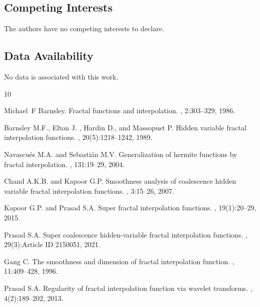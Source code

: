 \documentclass[sn-mathphys-num]{sn-jnl}
\numberwithin{equation}{section}
\begin{document}
\subsection*{Competing Interests}
\noindent The authors have no competing interests to declare.
\subsection*{Data Availability}
No data is associated with this work.


%

\begin{thebibliography}{10}

Michael~F Barnsley.
\newblock Fractal functions and interpolation.
, 2:303--329, 1986.

{Barnsley M.F.}, {Elton J. }, {Hardin D.}, and {Massopust P.}
\newblock Hidden variable fractal interpolation functions.
, 20(5):1218--1242, 1989.

{Navascu\'es M.A.} and {Sebasti\'an M.V.}
\newblock Generalization of hermite functions by fractal interpolation.
, 131:19--29, 2004.

{Chand A.K.B.} and {Kapoor G.P.}
\newblock Smoothness analysis of coalescence hidden variable fractal interpolation functions.
, 3:15--26, 2007.

{Kapoor G.P.} and {Prasad S.A.}
\newblock Super fractal interpolation functions.
, 19(1):20--29, 2015.

{Prasad S.A.}
\newblock Super coalescence hidden-variable fractal interpolation functions.
, 29(3):Article ID 2150051, 2021.

{Gang C.}
\newblock The smoothness and dimension of fractal interpolation function.
, 11:409--428, 1996.

{Prasad S.A.}
\newblock Regularity of fractal interpolation function via wavelet transforms.
, 4(2):189--202, 2013.


\end{thebibliography}
\end{document}
